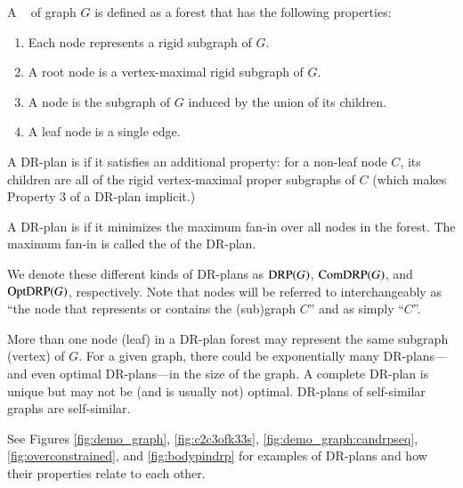 \begin{definition}\label{def:drp}
    A ~\cite{hoffman2001decompositionI} of graph $G$ is defined as a forest that has the following properties:
    \begin{enumerate}
        \item Each node represents a rigid subgraph of $G$.
        \item A root node is a vertex-maximal rigid subgraph of $G$.
        \item A node is the subgraph of $G$ induced by the union of its children.
        \item A leaf node is a single edge.
    \end{enumerate}
\end{definition}

\begin{definition}
    A DR-plan is  if it satisfies an additional property: for a non-leaf node $C$, its children are all of the rigid vertex-maximal proper subgraphs of $C$ (which makes Property 3 of a DR-plan implicit.)
\end{definition}

\begin{definition}
    A DR-plan is  if it minimizes the maximum fan-in over all nodes in the forest. The maximum fan-in is called the  of the DR-plan.
\end{definition}

We denote these different kinds of DR-plans as $\text{DRP}(G)$, $\text{ComDRP}(G)$, and $\text{OptDRP}(G)$, respectively. Note that nodes will be referred to interchangeably as ``the node that represents or contains the (sub)graph $C$'' and as simply ``$C$''.





%
\begin{remark}
More than one node (leaf) in a DR-plan forest may represent the same subgraph (vertex) of $G$.
For a given graph, there could be exponentially many DR-plans---and even optimal DR-plans---in the size of the graph. A complete DR-plan is unique but may not be (and is usually not) optimal. DR-plans of self-similar graphs are self-similar.
\end{remark}

See Figures \ref{fig:demo_graph}, \ref{fig:c2c3ofk33s}, \ref{fig:demo_graph:candrpseq}, \ref{fig:overconstrained}, and \ref{fig:bodypindrp} for examples of DR-plans and how their properties relate to each other.



